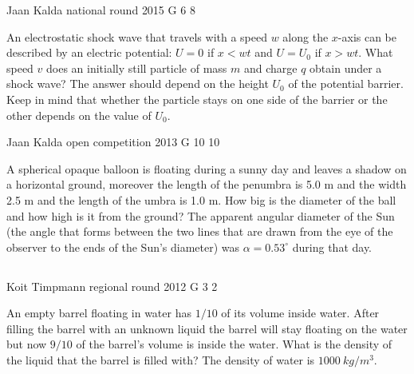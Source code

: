 \documentclass[11pt]{article}
\begin{document}
{Jaan Kalda} %
{national round} %
{2015} %
{G 6} %
{8} %
{

\ifEngStatement
An electrostatic shock wave that travels with a speed $w$ along the $x$-axis can be described by an electric potential: $U=0$ if $x<wt$ and $U=U_0$ if $x>wt$. What speed $v$ does an initially still particle of mass $m$ and charge $q$ obtain under a shock wave? The answer should depend on the height $U_0$ of the potential barrier. Keep in mind that whether the particle stays on one side of the barrier or the other depends on the value of $U_0$.
\fi
}

{Jaan Kalda} %
{open competition} %
{2013} %
{G 10} %
{10} %
{

\ifEngStatement
A spherical opaque balloon is floating during a sunny day and leaves a shadow on a horizontal ground, moreover the length of the penumbra is 5.0 m and the width 2.5 m and the length of the umbra is 1.0 m. How big is the diameter of the ball and how high is it from the ground? The apparent angular diameter of the Sun (the angle that forms between the two lines that are drawn from the eye of the observer to the ends of the Sun’s diameter) was $\alpha =0.53^\circ$ during that day.
\fi
}
\newpage\subsection{\protect{}}

{Koit Timpmann} %
{regional round} %
{2012} %
{G 3} %
{2} %
{

\ifEngStatement
An empty barrel floating in water has $1/10$ of its volume inside water. After filling the barrel with an unknown liquid the barrel will stay floating on the water but now $9/10$ of the barrel’s volume is inside the water. What is the density of the liquid that the barrel is filled with? The density of water is $\SI{1000}{kg/m^3}$.
\fi
}
\end{document}
